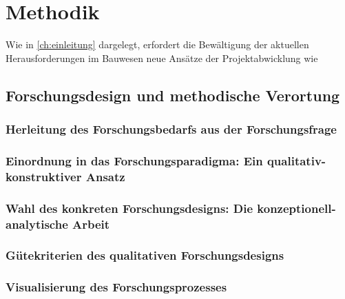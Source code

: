 \chapter{Methodik}
\label{ch:methodik}


Wie in \cref{ch:einleitung} dargelegt, erfordert die Bewältigung der aktuellen Herausforderungen im Bauwesen neue Ansätze der Projektabwicklung wie \

\section{Forschungsdesign und methodische Verortung}
\label{sec: 3.1}
\subsection{Herleitung des Forschungsbedarfs aus der Forschungsfrage}
\label{sec: 3.1.1}

%   


\subsection{Einordnung in das Forschungsparadigma: Ein qualitativ-konstruktiver Ansatz}
\label{sec: 3.1.2}

\subsection{Wahl des konkreten Forschungsdesigns: Die konzeptionell-analytische Arbeit}
\label{sec: 3.1.3}

  \subsection{Gütekriterien des qualitativen Forschungsdesigns}
\label{sec: 3.1.4}

\subsection{Visualisierung des Forschungsprozesses}
\label{sec: 3.1.5}

